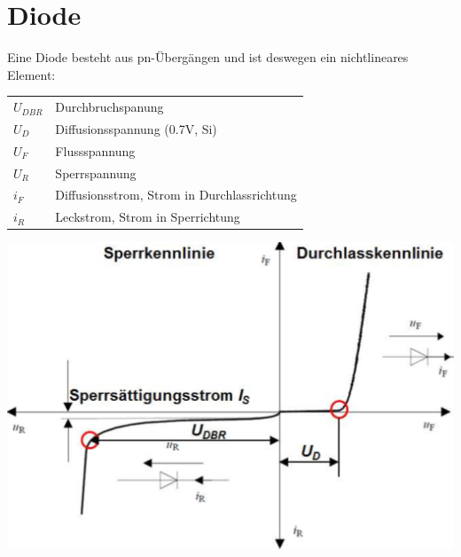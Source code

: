 \section{Diode}
Eine Diode besteht aus pn-Übergängen und ist deswegen ein nichtlineares Element:
\begin{multicols}{2}
     \begin{minipage}{\linewidth}
         \begin{tabular}{ll}
             $ U_{DBR} $    & Durchbruchspanung  \\ 
             $ U_D $        & Diffusionsspannung (0.7V, Si)  \\ 
             $ U_F $        & Flussspannung \\ 
             $ U_R $        & Sperrspannung  \\ 
              $ i_F $       & Diffusionsstrom, Strom in Durchlassrichtung  \\ 
              $ i_R $       & Leckstrom, Strom in Sperrichtung \\ 
            \end{tabular} 
        \end{minipage}
        
         \includegraphics[width=0.8\linewidth]{images/kennlinieDiode}
\end{multicols}
\vspace{-1.5cm}
